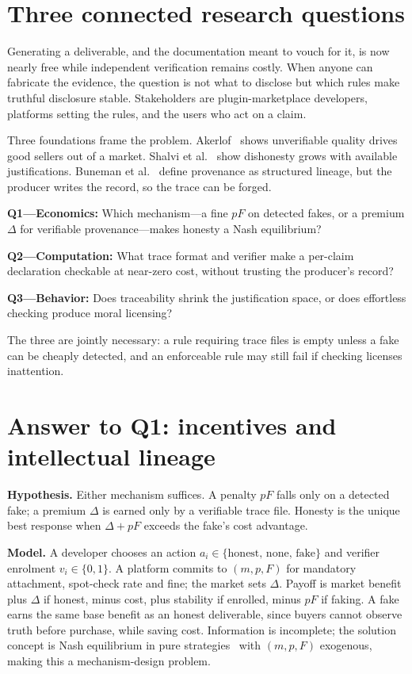 \section{Three connected research questions}
Generating a deliverable, and the documentation meant to vouch for it, is now nearly free while independent verification remains costly. When anyone can fabricate the evidence, the question is not what to disclose but which rules make truthful disclosure stable. Stakeholders are plugin-marketplace developers, platforms setting the rules, and the users who act on a claim.

Three foundations frame the problem. Akerlof~\cite{akerlof1970} shows unverifiable quality drives good sellers out of a market. Shalvi et al.~\cite{shalvi2012} show dishonesty grows with available justifications. Buneman et al.~\cite{buneman2001} define provenance as structured lineage, but the producer writes the record, so the trace can be forged.

\textbf{Q1---Economics:} Which mechanism---a fine $pF$ on detected fakes, or a premium $\Delta$ for verifiable provenance---makes honesty a Nash equilibrium?\par
\textbf{Q2---Computation:} What trace format and verifier make a per-claim declaration checkable at near-zero cost, without trusting the producer's record?\par
\textbf{Q3---Behavior:} Does traceability shrink the justification space, or does effortless checking produce moral licensing?

The three are jointly necessary: a rule requiring trace files is empty unless a fake can be cheaply detected, and an enforceable rule may still fail if checking licenses inattention.

\section{Answer to Q1: incentives and intellectual lineage}
\textbf{Hypothesis.} Either mechanism suffices. A penalty $pF$ falls only on a detected fake; a premium $\Delta$ is earned only by a verifiable trace file. Honesty is the unique best response when $\Delta + pF$ exceeds the fake's cost advantage.

\textbf{Model.} A developer chooses an action $a_i \in \{\text{honest, none, fake}\}$ and verifier enrolment $v_i \in \{0,1\}$. A platform commits to $(m,p,F)$ for mandatory attachment, spot-check rate and fine; the market sets $\Delta$. Payoff is market benefit plus $\Delta$ if honest, minus cost, plus stability if enrolled, minus $pF$ if faking. A fake earns the same base benefit as an honest deliverable, since buyers cannot observe truth before purchase, while saving cost. Information is incomplete; the solution concept is Nash equilibrium in pure strategies~\cite{nash1950} with $(m,p,F)$ exogenous, making this a mechanism-design problem.

